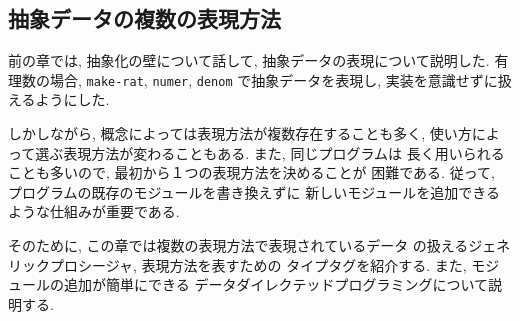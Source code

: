 \subsection{抽象データの複数の表現方法}
%
前の章では, 抽象化の壁について話して,
抽象データの表現について説明した. 有理数の場合,
\lstinline{make-rat}, \lstinline{numer}, \lstinline{denom}
で抽象データを表現し, 実装を意識せずに扱えるようにした.

しかしながら, 概念によっては表現方法が複数存在することも多く,
使い方によって選ぶ表現方法が変わることもある. また, 同じプログラムは
長く用いられることも多いので, 最初から１つの表現方法を決めることが
困難である. 従って, プログラムの既存のモジュールを書き換えずに
新しいモジュールを追加できるような仕組みが重要である.

そのために, この章では複数の表現方法で表現されているデータ
の扱えるジェネリックプロシージャ, 表現方法を表すための
タイプタグを紹介する. また, モジュールの追加が簡単にできる
データダイレクテッドプログラミングについて説明する.
%

